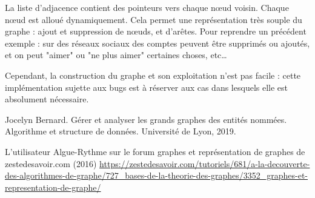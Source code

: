 \documentclass{article}
\begin{document}
La liste d'adjacence contient des pointeurs vers chaque nœud voisin. Chaque nœud est alloué dynamiquement. Cela permet une représentation très souple du graphe : ajout et suppression de nœuds, et d'arêtes. Pour reprendre un précédent exemple : sur des réseaux sociaux des comptes peuvent être supprimés ou ajoutés, et on peut "aimer" ou "ne plus aimer" certaines choses, etc…

Cependant, la construction du graphe et son exploitation n'est pas facile : cette implémentation sujette aux bugs est à réserver aux cas dans lesquels elle est absolument nécessaire. 

\begin{thebibliography}{9}
Jocelyn Bernard. Gérer et analyser les grands graphes des entités nommées. Algorithme et structure
de données. Université de Lyon, 2019.

L'utilisateur Algue-Rythme sur le forum graphes et représentation de graphes de zestedesavoir.com (2016)
\url{https://zestedesavoir.com/tutoriels/681/a-la-decouverte-des-algorithmes-de-graphe/727_bases-de-la-theorie-des-graphes/3352_graphes-et-representation-de-graphe/}

\end{thebibliography}
\end{document}
